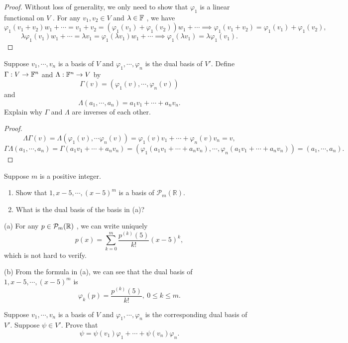 \documentclass{article}
\begin{document}
\begin{proof}
	Without loss of generality, we only need to show that \( \varphi_1 \) is a linear functional on \( V \) . For any \( v_1,v_2\in V \) and \( \lambda\in\mathbb{F} \) , we have
	\[ \varphi_1(v_1+v_2)w_1+\cdots=v_1+v_2=(\varphi_1(v_1)+\varphi_1(v_2))w_1+\cdots\implies \varphi_1(v_1+v_2)=\varphi_1(v_1)+\varphi_1(v_2), \] 
	\[ \lambda\varphi_1(v_1)w_1+\cdots=\lambda v_1=\varphi_1(\lambda v_1)w_1+\cdots\implies \varphi_1(\lambda v_1)=\lambda\varphi_1(v_1). \] 
\end{proof}

\begin{problem}[3F-8]
	Suppose $v_1, \cdots, v_n$ is a basis of $V$ and $\varphi_1, \cdots, \varphi_n$
	is the dual basis of $V'$. Define $\Gamma : V \to \mathbb{F}^n$ and
	$\Lambda : \mathbb{F}^n \to V$ by
	\[
		\Gamma(v) = (\varphi_1(v), \cdots, \varphi_n(v))
	\]
	and
	\[
		\Lambda(a_1, \cdots, a_n) = a_1v_1 + \cdots + a_nv_n.
	\]
	Explain why $\Gamma$ and $\Lambda$ are inverses of each other.
\end{problem}

\begin{proof}
	\[ \Lambda\Gamma(v)=\Lambda(\varphi_1(v),\cdots\varphi_n(v))=\varphi_1(v)v_1+\cdots+\varphi_n(v)v_n=v, \]
	\[ \Gamma\Lambda(a_1,\cdots,a_n)=\Gamma(a_1v_1+\cdots+a_nv_n)=(\varphi_1(a_1v_1+\cdots+a_nv_n),\cdots,\varphi_n(a_1v_1+\cdots+a_nv_n))=(a_1,\cdots,a_n). \]
\end{proof}

\begin{problem}[3F-10]
	Suppose $m$ is a positive integer.
	\begin{enumerate}[label=(\alph*)]
		\item Show that $1, x - 5, \cdots, (x - 5)^m$ is a basis of
		      $\mathcal{P}_m(\mathbb{R})$.
		\item What is the dual basis of the basis in (a)?
	\end{enumerate}
\end{problem}

\begin{solution}
	(a) For any \( p\in \mathcal{P}_m(\mathbb{R}) \) , we can write uniquely
	\[ p(x)=\sum_{k=0}^{m} \frac{p^{(k)}(5)}{k!} (x-5)^k, \] 
	which is not hard to verify.\par
	(b) From the formula in (a), we can see that the dual basis of \( 1, x - 5, \cdots, (x - 5)^m \) is
	\[ \varphi_k(p)=\frac{p^{(k)}(5)}{k!},\ 0\le k\le m. \] 
\end{solution}

\begin{problem}[3F-11]
	Suppose $v_1, \cdots, v_n$ is a basis of $V$ and $\varphi_1, \cdots, \varphi_n$
	is the corresponding dual basis of $V'$. Suppose $\psi \in V'$. Prove that
	\[
		\psi = \psi(v_1)\varphi_1 + \cdots + \psi(v_n)\varphi_n.
	\]
\end{problem}
\end{document}
